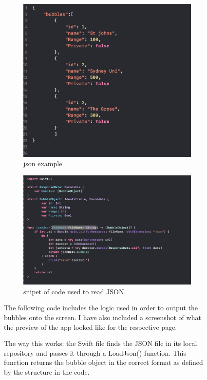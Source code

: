 \documentclass[a4paper, 11pt]{report}
\begin{document}
\begin{figure}
  \begin{subfigure}[h]{0.5\textwidth}
    \includegraphics[width=\textwidth]{json.png}
    \caption{json example}
    \label{fig:image1}
  \end{subfigure}
  \hfill
  \begin{subfigure}[h]{0.6\textwidth}
    \includegraphics[width=\textwidth]{readjson.png}
    \caption{snipet of code used to read JSON}
    \label{fig:image2}
  \end{subfigure}
  \caption{
The way this works: the Swift file finds the JSON file in its local repository and passes it through a LoadJson() function. This function returns the bubble object in the correct format as defined by the structure in the code.
}
The following code includes the logic used in order to output the bubbles onto the screen. I have also included a screenshot of what the preview of the app looked like for the respective page.


\end{figure}
\end{document}
